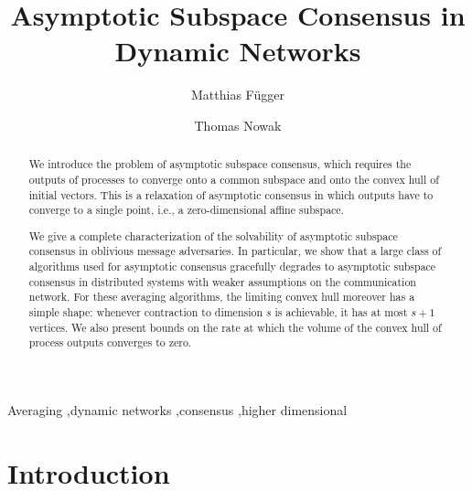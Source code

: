 \documentclass[preprint,12pt,a4paper]{elsarticle}
\theoremstyle{plain}
\theoremstyle{definition}
\begin{document}
\begin{frontmatter}

\title{Asymptotic Subspace Consensus in Dynamic Networks}

\author[lmf]{Matthias Függer}

\author[lmf,iuf]{Thomas Nowak}



\begin{abstract}
	We introduce the problem of asymptotic subspace consensus, which requires the outputs of processes to converge onto a common subspace and onto the convex hull of initial vectors.
	This is a relaxation of asymptotic consensus in which outputs have to converge to a single point, i.e., a zero-dimensional affine subspace.

	We give a complete characterization of the solvability of asymptotic subspace consensus in oblivious message adversaries.
	In particular, we show that a large class of algorithms used for asymptotic consensus gracefully degrades to asymptotic subspace consensus in distributed systems with weaker assumptions on the communication network.
	For these averaging algorithms, the limiting convex hull moreover has a simple shape: whenever contraction to dimension $s$ is achievable, it has at most $s+1$ vertices.
	We also present bounds on the rate at which the volume of the convex hull of process outputs converges to zero.
\end{abstract}

\begin{keyword}
Averaging \sep dynamic networks \sep consensus \sep higher dimensional
\end{keyword}

\end{frontmatter}


\section{Introduction}
\end{document}
